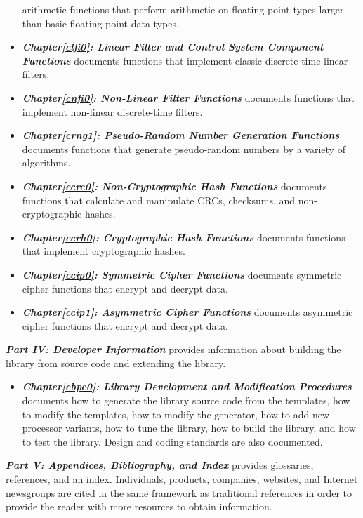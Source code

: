 \begin{itemize}
      arithmetic functions that perform arithmetic on floating-point types 
      larger than basic floating-point data types.  
\item \emph{\textbf{Chapter\postchapterwordnonstretchable{}\ref{clfi0}: 
      Linear Filter and Control System Component Functions}} documents functions 
      that implement classic discrete-time linear filters.  
\item \emph{\textbf{Chapter\postchapterwordnonstretchable{}\ref{cnfi0}: 
      Non-Linear Filter Functions}} documents functions that implement 
      non-linear discrete-time filters.  
\item \emph{\textbf{Chapter\postchapterwordnonstretchable{}\ref{crng1}: 
      Pseudo-Random Number Generation Functions}} documents functions that generate
      pseudo-random numbers by a variety of algorithms.
\item \emph{\textbf{Chapter\postchapterwordnonstretchable{}\ref{ccrc0}: 
      Non-Cryptographic Hash Functions}} documents functions that calculate and 
      manipulate CRCs, checksums, and non-cryptographic hashes.  
\item \emph{\textbf{Chapter\postchapterwordnonstretchable{}\ref{ccrh0}: 
      Cryptographic Hash Functions}} documents functions that implement 
      cryptographic hashes.  
\item \emph{\textbf{Chapter\postchapterwordnonstretchable{}\ref{ccip0}: 
      Symmetric Cipher Functions}} documents symmetric cipher functions that 
      encrypt and decrypt data.  
\item \emph{\textbf{Chapter\postchapterwordnonstretchable{}\ref{ccip1}: 
      Asymmetric Cipher Functions}} documents asymmetric cipher functions that 
      encrypt and decrypt data.  
\end{itemize}

\emph{\textbf{Part IV: Developer Information}} provides 
information about building the library from source code and
extending the library.

\begin{itemize}
\item \emph{\textbf{Chapter\postchapterwordnonstretchable{}\ref{cbpc0}: 
      Library Development and Modification Procedures}} 
      documents how to generate the library source code from
      the templates, how to modify the templates, how to
      modify the generator, how to add new processor variants,
      how to tune the library, how to build the library, and how
      to test the library.  Design and coding standards are also
      documented.
\end{itemize}

\emph{\textbf{Part V: Appendices, Bibliography, and Index}} 
provides glossaries, references, and an index.  Individuals, 
products, companies, websites, and Internet newsgroups are 
cited in the same framework as traditional references in 
order to provide the reader with more resources to obtain 
information.  

